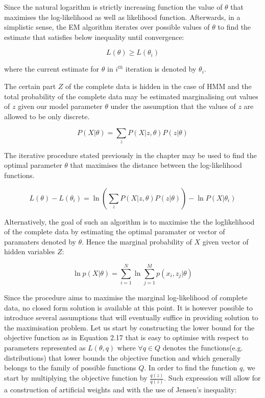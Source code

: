 Since the natural logarithm is strictly increasing function the value of $\theta$ that maximises the log-likelihood as well as likelihood function. Afterwards, in a simplistic sense, the EM algorithm iterates over possible values of $\theta$ to find the estimate that satisfies below inequality until convergence:

\begin{equation}
L(\theta) \geq L(\theta_i)
\end{equation}

where the current estimate for $\theta$ in $i^{th}$ iteration is denoted by $\theta_i$. 

The certain part $Z$ of the complete data is hidden in the case of HMM and the total probability of the complete data may be estimated marginalising out values of $z$ given our model parameter $\theta$ under the assumption that the values of $z$ are allowed to be only discrete. 

\begin{equation}
P(X|\theta) = \sum_z P(X|z,\theta) P(z|\theta)
\end{equation}

The iterative procedure stated previously in the chapter may be used to find the optimal parameter $\theta$ that maximises the distance between the log-likelihood functions. 

\begin{equation}
L(\theta) - L(\theta_i) = \ln (\sum_z P(X|z,\theta) P(z|\theta) ) - \ln P(X|\theta_i)
\end{equation}

Alternatively, the goal of such an algorithm is to maximise the the loglikelihood of the complete data by estimating the optimal paramater or vector of paramaters denoted by $\theta$. Hence the marginal probability of $X$ given vector of hidden variables $Z$:

\begin{equation}
\ln p(X|\theta) = \sum_{i=1}^{N} \ln \sum_{j=1}^{M} p(x_i, z_j|\theta)
\end{equation}

Since the procedure aims to maximise the marginal log-likelihood of complete data, no closed form solution is available at this point. It is however possible to introduce several assumptions that will eventually suffice in providing solution to the maximisation problem. Let us start by constructing the lower bound for the objective function as in Equation 2.17 that is easy to optimise with respect to parameters represented as $L(\theta, q)$ where $\forall q \in Q$ denotes the functions(e.g. distributions) that lower bounds the objective function and which generally belongs to the family of possible functions $Q$. In order to find the function $q$, we start by multiplying the objective function by $\frac{q(z)}{q(z)}$. Such expression will allow for a construction of artificial weights and with the use of Jensen's inequality:

